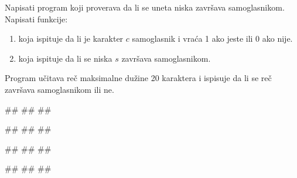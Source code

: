 \begin{Exercise}[label=NIS_04] 
Napisati program koji proverava da li se uneta niska završava samoglasnikom. Napisati funkcije:
\begin{enumerate}
\setlength\itemsep{0em}
\item  {} koja ispituje da li je karakter $c$ samoglasnik i vraća 1 ako jeste ili 0 ako nije.
\item  {}  koja ispituje da li se niska $s$ završava samoglasnikom. 
\end{enumerate}
Program učitava reč maksimalne dužine 20 karaktera i ispisuje da li se reč završava samoglasnikom ili ne.

\begin{miditest}
\begin{upotreba}{1}
#\naslovInt#
##
##
\end{upotreba}
\end{miditest}
\begin{miditest}
\begin{upotreba}{2}
#\naslovInt#
##
##
\end{upotreba}
\end{miditest}

\begin{miditest}
\begin{upotreba}{3}
#\naslovInt#
##
##
\end{upotreba}
\end{miditest}
\begin{miditest}
\begin{upotreba}{4}
#\naslovInt#
##
##
\end{upotreba}
\end{miditest}
\end{Exercise}
\ifresenja
\begin{Answer}[ref=NIS_04]
\end{Answer}
\fi


